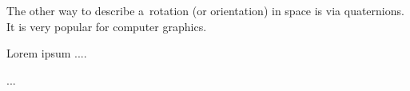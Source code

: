 

\label{section:quaternions}

The other way to describe a~rotation (or orientation) in space is via quaternions.
It is very popular for computer graphics.

Lorem ipsum ....


...


